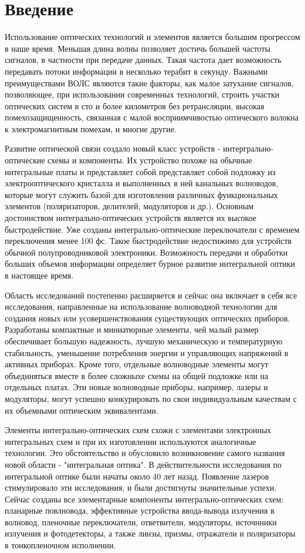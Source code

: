 \section*{Введение}
Использование оптических технологий и элементов является большим прогрессом в наше время. Меньшая длина волны позволяет достичь большей частоты сигналов, в частности при передаче данных. Такая частота дает возможность передавать потоки информации в несколько терабит в секунду. Важными преимуществами ВОЛС являются такие факторы, как малое затухание сигналов, позволяющее, при использовании современных технологий, строить участки оптических систем в сто и более километров без ретрансляции, высокая помехозащищенность, связанная с малой восприимчивостью оптического волокна к электромагнитным помехам, и многие другие.

Развитие оптической связи создало новый класс устройств - интергрально-оптические схемы и компоненты. Их устройство похоже на обычные интегральные платы и представляет собой представляет собой подложку из электрооптического кристалла и выполненных в ней канальных волноводов, которые могут служить базой для изготовления различных функциональных элементов  (поляризаторов, делителей, модуляторов и др.). Основным достоинством интегрально-оптических устройств является их высокое быстродействие. Уже созданы интегрально-оптические  переключатели с временем переключения менее 100 фс. Такое быстродействие недостижимо для устройств обычной полупроводниковой электроники. Возможность передачи и обработки больших объемов информации определяет бурное развитие интегральной оптики в настоящее время.

Область исследований постепенно расширяется и сейчас она включает в себя все исследования, направленные на использование волноводной технологии для создания новых или усовершенствования существующих оптических приборов. Разработаны компактные и миниатюрные элементы, чей малый размер обеспечивает большую надежность, лучшую механическую и температурную стабильность, уменьшение потребления энергии и управляющих напряжений в активных приборах. Кроме того, отдельные волноводные элементы могут объединяться вместе в более сложныхе схемы на общей подложке или на отдельных платах. Эти новые волноводные приборы, например, лазеры и модуляторы, могут успешно конкурировать по свои индивидуальным качествам с их объемными оптическим эквивалентами.

Элементы интегрально-оптических схем схожи с элементами электронных интегральных схем и при их изготовлении используются аналогичные технологии. Это обстоятельство и обусловило возникновение самого названия новой области - "интегральная оптика". В действительности исследования по интегральной оптике были начаты около 40 лет назад. Появление лазеров стимулировало эти исследования, и были достигнуты значительные успехи. Сейчас созданы все элементарные компоненты интегрально-оптических схем: планарные повлновода, эффективные устройства ввода-вывода излучения в волновод, пленочные переключатели, ответвители, модуляторы, источнники излучения и фотодетекторы, а также линзы, призмы, отражатели и поляризаторы в тонкопленочном исполнении.

